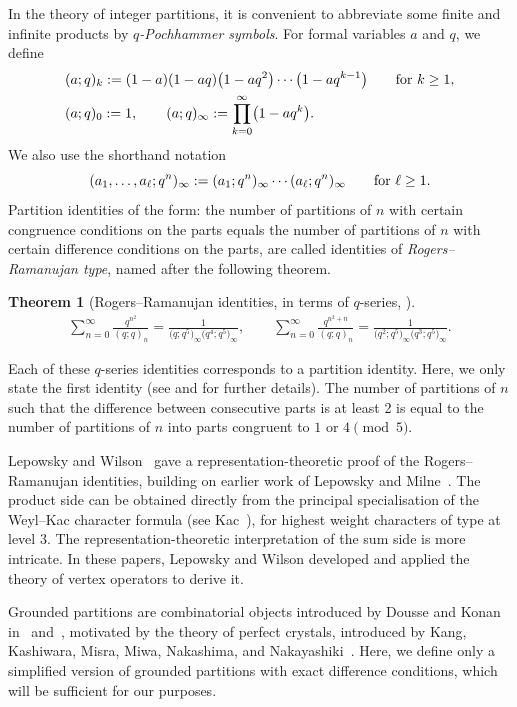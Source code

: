 \documentclass[pdftex]{sigma}
\numberwithin{equation}{section}
\newtheorem{Theorem}{Theorem}[section]
\theoremstyle{definition}
\begin{document}
In the theory of integer partitions, it is convenient to abbreviate some finite and infinite products by \emph{$q$-Pochhammer symbols}. For formal variables $a$ and $q$, we define
\begin{align*}
 & (a;q)_k := (1 - a)(1 - aq)\bigl(1 - aq^2\bigr) \cdots \bigl(1 - aq^{k-1}\bigr) \qquad\text{for $ k \geq 1 $},\\
 & (a;q)_0:= 1, \qquad (a;q)_\infty := \prod_{k=0}^{\infty} \bigl(1 - aq^k\bigr).
\end{align*}
We also use the shorthand notation
\[(a_1, \ldots, a_\ell; q^n)_\infty := (a_1; q^n)_\infty \cdots (a_\ell; q^n)_\infty \qquad\text{for $ \ell \geq 1 $}.\]
Partition identities of the form: the number of partitions of $n$ with certain congruence conditions on the parts equals the number of partitions of $n$ with certain difference conditions on the parts, are called identities of \emph{Rogers--Ramanujan type}, named after the following theorem.

\begin{Theorem}[Rogers--Ramanujan identities, in terms of $q$-series, \cite{RR19}]%
\begin{align*}
 \sum_{n=0}^{\infty} \frac{q^{n^2}}{(q;q)_n} = \frac{1}{\bigl(q;q^5\bigr)_\infty \bigl(q^4;q^5\bigr)_\infty}, \qquad
 \sum_{n=0}^{\infty} \frac{q^{n^2+n}}{(q;q)_n} = \frac{1}{\bigl(q^2;q^5\bigr)_\infty \bigl(q^3;q^5\bigr)_\infty}.
\end{align*}
\end{Theorem}
Each of these $q$-series identities corresponds to a partition identity. Here, we only state the first identity (see \cite{Mac16} and \cite{Sch17} for further details). The number of partitions of $ n $ such that the difference between consecutive parts is at least 2 is equal to the number of partitions of $ n $ into parts congruent to $ 1 $ or $ 4 \pmod 5 $.

Lepowsky and Wilson~\cite{LW84,LW85} gave a representation-theoretic
proof of the Rogers--Ramanujan identities, building on earlier work of
Lepowsky and Milne~\cite{LM78}. The product side can be obtained
directly from the principal specialisation of the Weyl--Kac character
formula (see Kac~\cite[Theorem 10.4]{Kac90}), for highest
weight characters of type  at level $3$. The
representation-theoretic interpretation of the sum side is more
intricate. In these papers, Lepowsky and Wilson developed and applied
the theory of vertex operators to derive it.

Grounded partitions are combinatorial objects introduced by Dousse and
Konan in~\cite{DK19b} and~\cite{DK22}, motivated by the theory of
perfect crystals, introduced by Kang, Kashiwara, Misra, Miwa,
Nakashima, and Nakayashiki~\cite{KMN92}. Here, we
define only a simplified version of grounded partitions with exact
difference conditions, which will be sufficient for our purposes.
\end{document}
